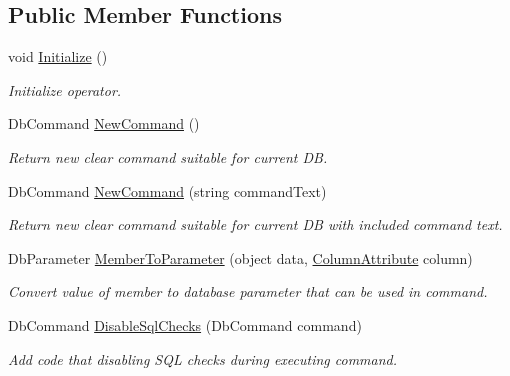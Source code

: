 \subsection*{Public Member Functions}
\begin{DoxyCompactItemize}
\item 
void \mbox{\hyperlink{interface_uniform_data_operator_1_1_sql_1_1_i_sql_operator_a590fa080f8c35ebf5ee6ac535545e2a8}{Initialize}} ()
\begin{DoxyCompactList}\small\item\em Initialize operator. \end{DoxyCompactList}\item 
Db\+Command \mbox{\hyperlink{interface_uniform_data_operator_1_1_sql_1_1_i_sql_operator_afc0fd8b8c82515c498a6959453f331f1}{New\+Command}} ()
\begin{DoxyCompactList}\small\item\em Return new clear command suitable for current DB. \end{DoxyCompactList}\item 
Db\+Command \mbox{\hyperlink{interface_uniform_data_operator_1_1_sql_1_1_i_sql_operator_a10c43a3bfb6e8c88b692488c3341f297}{New\+Command}} (string command\+Text)
\begin{DoxyCompactList}\small\item\em Return new clear command suitable for current DB with included command text. \end{DoxyCompactList}\item 
Db\+Parameter \mbox{\hyperlink{interface_uniform_data_operator_1_1_sql_1_1_i_sql_operator_ac09f73e97974a4bd697046e0c54a93d3}{Member\+To\+Parameter}} (object data, \mbox{\hyperlink{class_uniform_data_operator_1_1_sql_1_1_markup_1_1_column_attribute}{Column\+Attribute}} column)
\begin{DoxyCompactList}\small\item\em Convert value of member to database parameter that can be used in command. \end{DoxyCompactList}\item 
Db\+Command \mbox{\hyperlink{interface_uniform_data_operator_1_1_sql_1_1_i_sql_operator_a12d464e0532a3e194b1221eee0c32d34}{Disable\+Sql\+Checks}} (Db\+Command command)
\begin{DoxyCompactList}\small\item\em Add code that disabling S\+QL checks during executing command. \end{DoxyCompactList}\item 

\end{DoxyCompactItemize}
